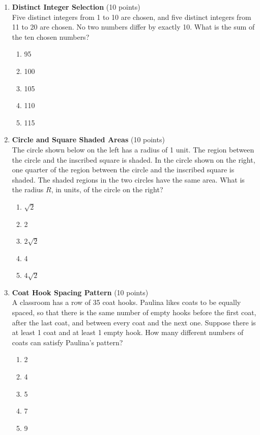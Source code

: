 \begin{enumerate}
  \item \textbf{Distinct Integer Selection} (10 points)\\
  Five distinct integers from 1 to 10 are chosen, and five distinct integers from 11 to 20 are chosen. No two numbers differ by exactly 10. What is the sum of the ten chosen numbers?
  \begin{enumerate}[label=(\Alph*)]
    \item 95
    \item 100
    \item 105
    \item 110
    \item 115
  \end{enumerate}
  \begin{subanswer}
  \end{subanswer}

  \newpage

  \item \textbf{Circle and Square Shaded Areas} (10 points)\\
  The circle shown below on the left has a radius of 1 unit. The region between the circle and the inscribed square is shaded. In the circle shown on the right, one quarter of the region between the circle and the inscribed square is shaded. The shaded regions in the two circles have the same area. What is the radius $R$, in units, of the circle on the right?
  \begin{enumerate}[label=(\Alph*)]
    \item $\sqrt{2}$
    \item 2
    \item $2\sqrt{2}$
    \item 4
    \item $4\sqrt{2}$
  \end{enumerate}
  \begin{subanswer}
  \end{subanswer}

  \item \textbf{Coat Hook Spacing Pattern} (10 points)\\
  A classroom has a row of 35 coat hooks. Paulina likes coats to be equally spaced, so that there is the same number of empty hooks before the first coat, after the last coat, and between every coat and the next one. Suppose there is at least 1 coat and at least 1 empty hook. How many different numbers of coats can satisfy Paulina's pattern?
  \begin{enumerate}[label=(\Alph*)]
    \item 2
    \item 4
    \item 5
    \item 7
    \item 9
  \end{enumerate}
  \begin{subanswer}
  \end{subanswer}


\end{enumerate}
